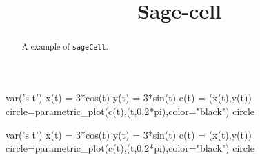 \documentclass{ximera}
\title[Examples:]{Sage-cell}
\begin{document}
\begin{abstract}
  A example of \texttt{sageCell}.
\end{abstract}
\maketitle

\begin{sageCell}
var('s t')
x(t) = 3*cos(t)
y(t) = 3*sin(t)
c(t) = (x(t),y(t))
circle=parametric_plot(c(t),(t,0,2*pi),color="black")
circle
\end{sageCell}

\begin{sageOutput}
var('s t')
x(t) = 3*cos(t)
y(t) = 3*sin(t)
c(t) = (x(t),y(t))
circle=parametric_plot(c(t),(t,0,2*pi),color="black")
circle
\end{sageOutput}
\end{document}
